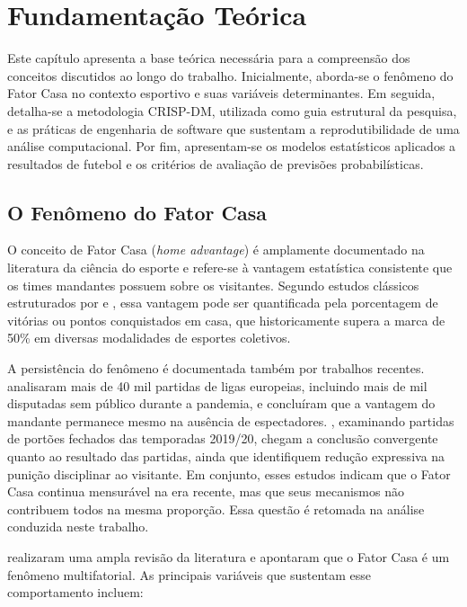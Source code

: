 
\chapter{Fundamentação Teórica}\label{cap:fundamentacao}

Este capítulo apresenta a base teórica necessária para a compreensão dos
conceitos discutidos ao longo do trabalho. Inicialmente, aborda-se o fenômeno do
Fator Casa no contexto esportivo e suas variáveis determinantes. Em seguida,
detalha-se a metodologia CRISP-DM, utilizada como guia estrutural da pesquisa, e
as práticas de engenharia de software que sustentam a reprodutibilidade de uma
análise computacional. Por fim, apresentam-se os modelos estatísticos aplicados a
resultados de futebol e os critérios de avaliação de previsões probabilísticas.

\section{O Fenômeno do Fator Casa}\label{sec:fator-casa}

O conceito de Fator Casa (\textit{home advantage}) é amplamente documentado na
literatura da ciência do esporte e refere-se à vantagem estatística consistente
que os times mandantes possuem sobre os visitantes. Segundo estudos clássicos
estruturados por  e , essa
vantagem pode ser quantificada pela porcentagem de vitórias ou pontos
conquistados em casa, que historicamente supera a marca de 50\% em diversas
modalidades de esportes coletivos.

A persistência do fenômeno é documentada também por trabalhos recentes.
 analisaram mais de 40 mil partidas de ligas
europeias, incluindo mais de mil disputadas sem público durante a pandemia, e
concluíram que a vantagem do mandante permanece mesmo na ausência de
espectadores. , examinando partidas de portões fechados
das temporadas 2019/20, chegam a conclusão convergente quanto ao resultado das
partidas, ainda que identifiquem redução expressiva na punição disciplinar ao
visitante. Em conjunto, esses estudos indicam que o Fator Casa continua
mensurável na era recente, mas que seus mecanismos não contribuem todos na mesma
proporção. Essa questão é retomada na análise conduzida neste trabalho.

 realizaram uma ampla revisão da literatura e apontaram
que o Fator Casa é um fenômeno multifatorial. As principais variáveis que
sustentam esse comportamento incluem:

